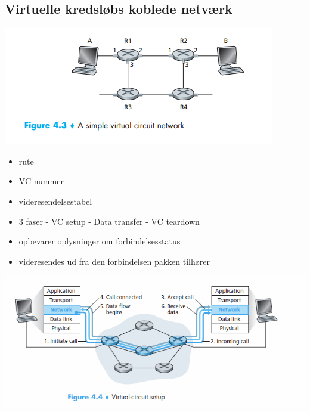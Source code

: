 \subsection{Virtuelle kredsløbs koblede netværk}
{\includegraphics{4-network-layer/vc-network.png}
\begin{itemize}
	\item rute 
	\item VC nummer
	\item videresendelsestabel
	\item 3 faser - VC setup - Data transfer - VC teardown
	\item opbevarer oplysninger om forbindelsesstatus
	\item videresendes ud fra den forbindelsen pakken tilhører
\end{itemize}
{\includegraphics{4-network-layer/vc-network-3faser.png}

}}
